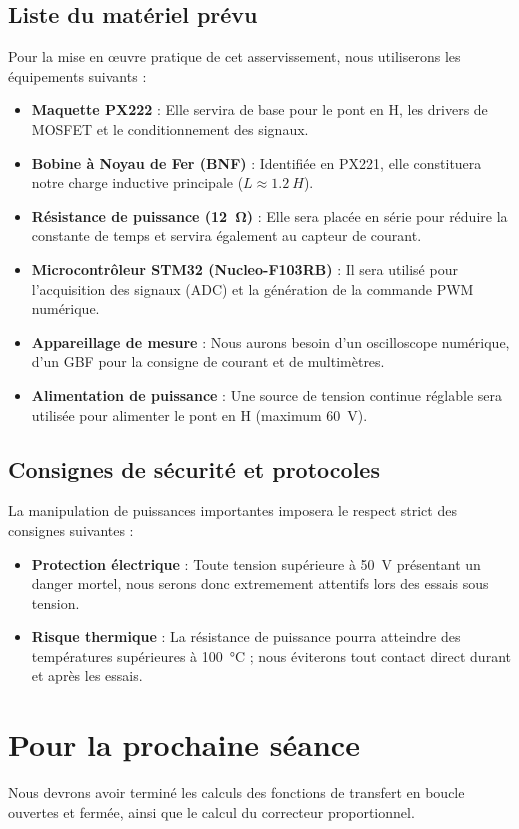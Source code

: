 \documentclass[11pt]{report}
\begin{document}
\subsection{Liste du matériel prévu}
Pour la mise en œuvre pratique de cet asservissement, nous utiliserons les équipements suivants :
\begin{itemize}
    \item \textbf{Maquette PX222} : Elle servira de base pour le pont en H, les drivers de MOSFET et le conditionnement des signaux.
    \item \textbf{Bobine à Noyau de Fer (BNF)} : Identifiée en PX221, elle constituera notre charge inductive principale ($L \approx \qty{1,2}{H}$).
    \item \textbf{Résistance de puissance (\qty{12}{\ohm})} : Elle sera placée en série pour réduire la constante de temps et servira également au capteur de courant.
    \item \textbf{Microcontrôleur STM32 (Nucleo-F103RB)} : Il sera utilisé pour l'acquisition des signaux (ADC) et la génération de la commande PWM numérique.
    \item \textbf{Appareillage de mesure} : Nous aurons besoin d'un oscilloscope numérique, d'un GBF pour la consigne de courant et de multimètres.
    \item \textbf{Alimentation de puissance} : Une source de tension continue réglable sera utilisée pour alimenter le pont en H (maximum \qty{60}{V}).
\end{itemize}

\subsection{Consignes de sécurité et protocoles}
La manipulation de puissances importantes imposera le respect strict des consignes suivantes :
\begin{itemize}
    \item \textbf{Protection électrique} : Toute tension supérieure à \qty{50}{V} présentant un danger mortel, nous serons donc extremement attentifs lors des essais sous tension.
    \item \textbf{Risque thermique} : La résistance de puissance pourra atteindre des températures supérieures à \qty{100}{\degreeCelsius} ; nous éviterons tout contact direct durant et après les essais.
\end{itemize}

\section{Pour la prochaine séance}
Nous devrons avoir terminé les calculs des fonctions de transfert en boucle ouvertes et fermée, ainsi que le calcul du correcteur proportionnel.
\end{document}
